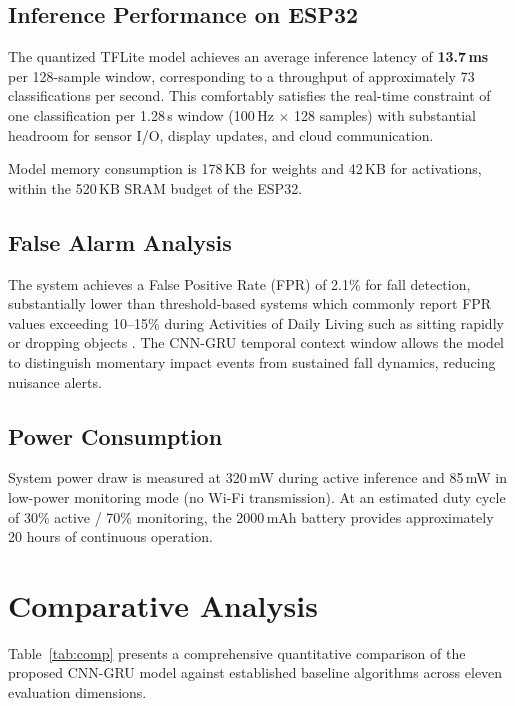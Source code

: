 \documentclass[conference]{IEEEtran}
\begin{document}
\subsection{Inference Performance on ESP32}

The quantized TFLite model achieves an average inference latency of \textbf{13.7\,ms} per 128-sample window, corresponding to a throughput of approximately 73 classifications per second. This comfortably satisfies the real-time constraint of one classification per 1.28\,s window (100\,Hz $\times$ 128 samples) with substantial headroom for sensor I/O, display updates, and cloud communication.

Model memory consumption is 178\,KB for weights and 42\,KB for activations, within the 520\,KB SRAM budget of the ESP32.

\subsection{False Alarm Analysis}

The system achieves a False Positive Rate (FPR) of 2.1\% for fall detection, substantially lower than threshold-based systems which commonly report FPR values exceeding 10--15\% during Activities of Daily Living such as sitting rapidly or dropping objects \cite{kumar2024}. The CNN-GRU temporal context window allows the model to distinguish momentary impact events from sustained fall dynamics, reducing nuisance alerts.

\subsection{Power Consumption}

System power draw is measured at 320\,mW during active inference and 85\,mW in low-power monitoring mode (no Wi-Fi transmission). At an estimated duty cycle of 30\% active / 70\% monitoring, the 2000\,mAh battery provides approximately 20 hours of continuous operation.

\section{Comparative Analysis}

Table~\ref{tab:comp} presents a comprehensive quantitative comparison of the proposed CNN-GRU model against established baseline algorithms across eleven evaluation dimensions.
\end{document}
